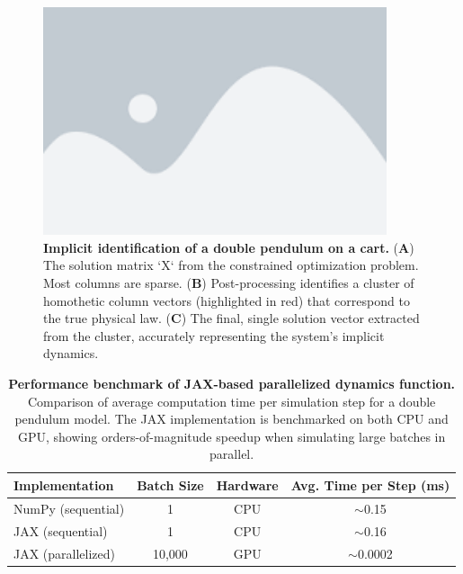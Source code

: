 \documentclass[12pt]{article}
\begin{document}
\begin{figure}
	\centering
	\includegraphics[width=0.9\textwidth]{placeholder.png}
	\caption{\textbf{Implicit identification of a double pendulum on a cart.} 
    (\textbf{A}) The solution matrix `X` from the constrained optimization problem. Most columns are sparse. (\textbf{B}) Post-processing identifies a cluster of homothetic column vectors (highlighted in red) that correspond to the true physical law. (\textbf{C}) The final, single solution vector extracted from the cluster, accurately representing the system's implicit dynamics.}
	\label{fig:implicit_results}
\end{figure}



\begin{table}
	\centering
	\caption{\textbf{Performance benchmark of JAX-based parallelized dynamics function.}
    Comparison of average computation time per simulation step for a double pendulum model. The JAX implementation is benchmarked on both CPU and GPU, showing orders-of-magnitude speedup when simulating large batches in parallel.}
	\label{tab:jax_performance}
	
	\begin{tabular}{lccc}
		\\
		\hline
		Implementation & Batch Size & Hardware & Avg. Time per Step (ms) \\
		\hline
		NumPy (sequential) & 1 & CPU & $\sim$0.15 \\
		JAX (sequential) & 1 & CPU & $\sim$0.16 \\
		JAX (parallelized) & 10,000 & GPU & $\sim$0.0002 \\
		\hline
	\end{tabular}
\end{table}
\end{document}
